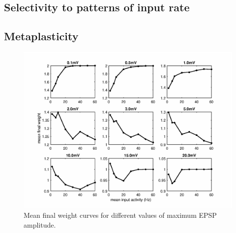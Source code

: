 \documentclass[a4paper,12pt]{report}
\theoremstyle{definition}
\begin{document}
\subsection{Selectivity to patterns of input rate} %


\subsection{Metaplasticity}

\begin{figure}[h]
    \includegraphics[width=\textwidth]{figures/fig_3x3weightcurves}
    \caption{Mean final weight curves for different values of maximum EPSP amplitude.}
    \label{fig:3x3weightcurves}
\end{figure}
\end{document}
